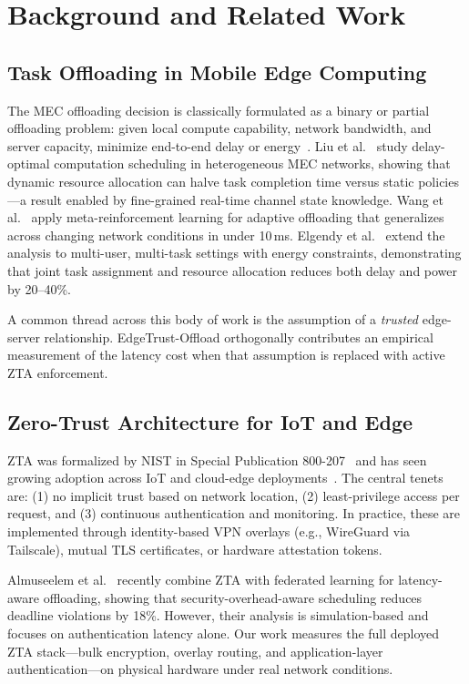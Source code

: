 \documentclass[10pt,twocolumn]{article}
\begin{document}
\section{Background and Related Work}

\subsection{Task Offloading in Mobile Edge Computing}

The MEC offloading decision is classically formulated as a binary or
partial offloading problem: given local compute capability, network
bandwidth, and server capacity, minimize end-to-end delay or
energy~\cite{mao2017survey}.  Liu et al.~\cite{liu2018dynamic} study
delay-optimal computation scheduling in heterogeneous MEC networks,
showing that dynamic resource allocation can halve task completion time
versus static policies—a result enabled by fine-grained real-time channel
state knowledge.  Wang et al.~\cite{wang2020fast} apply meta-reinforcement
learning for adaptive offloading that generalizes across changing network
conditions in under 10\,ms.  Elgendy et al.~\cite{elgendy2020efficient}
extend the analysis to multi-user, multi-task settings with energy
constraints, demonstrating that joint task assignment and resource
allocation reduces both delay and power by 20--40\%.

A common thread across this body of work is the assumption of a
\emph{trusted} edge-server relationship.  EdgeTrust-Offload orthogonally
contributes an empirical measurement of the latency cost when that assumption
is replaced with active ZTA enforcement.

\subsection{Zero-Trust Architecture for IoT and Edge}

ZTA was formalized by NIST in Special Publication 800-207~\cite{nist_zt} and
has seen growing adoption across IoT and cloud-edge
deployments~\cite{ali2024zt}.  The central tenets are: (1) no implicit trust
based on network location, (2) least-privilege access per request, and (3)
continuous authentication and monitoring.  In practice, these are implemented
through identity-based VPN overlays (e.g., WireGuard via Tailscale), mutual
TLS certificates, or hardware attestation tokens.

Almuseelem et al.~\cite{almuseelem2025fl} recently combine ZTA with
federated learning for latency-aware offloading, showing that
security-overhead-aware scheduling reduces deadline violations by 18\%.
However, their analysis is simulation-based and focuses on authentication
latency alone.  Our work measures the full deployed ZTA stack—bulk encryption,
overlay routing, and application-layer authentication—on physical hardware
under real network conditions.
\end{document}
